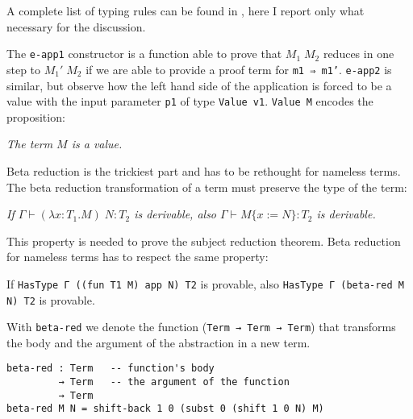 \documentclass{article}
\begin{document}
\noindent
A complete list of typing rules can be found in \cite[p.\ 8]{crafa}, here I report only what necessary for the discussion.



The \texttt{e-app1} constructor is a function able to prove that $M_1 \; M_2$ reduces in one step to $M_1' \; M_2$ if we are able to provide a proof term for \texttt{m1 ⇒ m1'}.
\texttt{e-app2} is similar, but observe how the left hand side of the application is forced to be a value with the input parameter \texttt{p1} of type \texttt{Value v1}.
\texttt{Value M} encodes the proposition:

\vspace{1em}
\noindent
\textit{The term $M$ is a value.}
\vspace{1em}

\noindent
Beta reduction is the trickiest part and has to be rethought for nameless terms.
The beta reduction transformation of a term must preserve the type of the term:

\vspace{1em}
\noindent
\textit{If $\Gamma \vdash (\lambda x:T_1.M) \; N : T_2$ is derivable, also $\Gamma \vdash M\{x:=N\} : T_2$ is derivable.}
\vspace{1em}

\noindent
This property is needed to prove the subject reduction theorem.
Beta reduction for nameless terms has to respect the same property:

\begin{stat}
\label{type-pres-beta}
If \textnormal{\texttt{HasType Γ ((fun T1 M) app N) T2}} is provable, also \textnormal{\texttt{HasType Γ (beta-red M N) T2}} is provable.
\end{stat}

\noindent
With \texttt{beta-red} we denote the function (\texttt{Term → Term → Term}) that transforms the body and the argument of the abstraction in a new term.

\begin{verbatim}
beta-red : Term   -- function's body
         → Term   -- the argument of the function
         → Term
beta-red M N = shift-back 1 0 (subst 0 (shift 1 0 N) M)
\end{verbatim}
\end{document}
